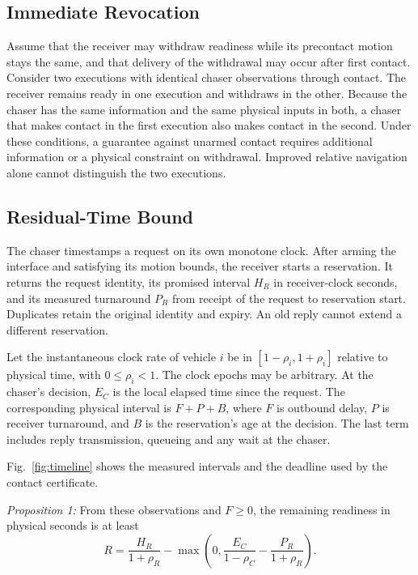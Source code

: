 \documentclass{IEEEtaes}
\begin{document}
\subsection{Immediate Revocation}

Assume that the receiver may withdraw readiness while its precontact motion stays the same, and that delivery of the withdrawal may occur after first contact. Consider two executions with identical chaser observations through contact. The receiver remains ready in one execution and withdraws in the other. Because the chaser has the same information and the same physical inputs in both, a chaser that makes contact in the first execution also makes contact in the second. Under these conditions, a guarantee against unarmed contact requires additional information or a physical constraint on withdrawal. Improved relative navigation alone cannot distinguish the two executions.

\subsection{Residual-Time Bound}

The chaser timestamps a request on its own monotone clock. After arming the interface and satisfying its motion bounds, the receiver starts a reservation. It returns the request identity, its promised interval $H_R$ in receiver-clock seconds, and its measured turnaround $P_R$ from receipt of the request to reservation start. Duplicates retain the original identity and expiry. An old reply cannot extend a different reservation.

Let the instantaneous clock rate of vehicle $i$ be in $[1-\rho_i,1+\rho_i]$ relative to physical time, with $0\leq\rho_i<1$. The clock epochs may be arbitrary. At the chaser's decision, $E_C$ is the local elapsed time since the request. The corresponding physical interval is $F+P+B$, where $F$ is outbound delay, $P$ is receiver turnaround, and $B$ is the reservation's age at the decision. The last term includes reply transmission, queueing and any wait at the chaser.

Fig.~\ref{fig:timeline} shows the measured intervals and the deadline used by the contact certificate.

\emph{Proposition 1:} From these observations and $F\geq0$, the remaining readiness in physical seconds is at least
\begin{equation}
R = \frac{H_R}{1+\rho_R}
 - \max\left(0,\frac{E_C}{1-\rho_C}
              -\frac{P_R}{1+\rho_R}\right).
\label{eq:remaining}
\end{equation}
\end{document}
